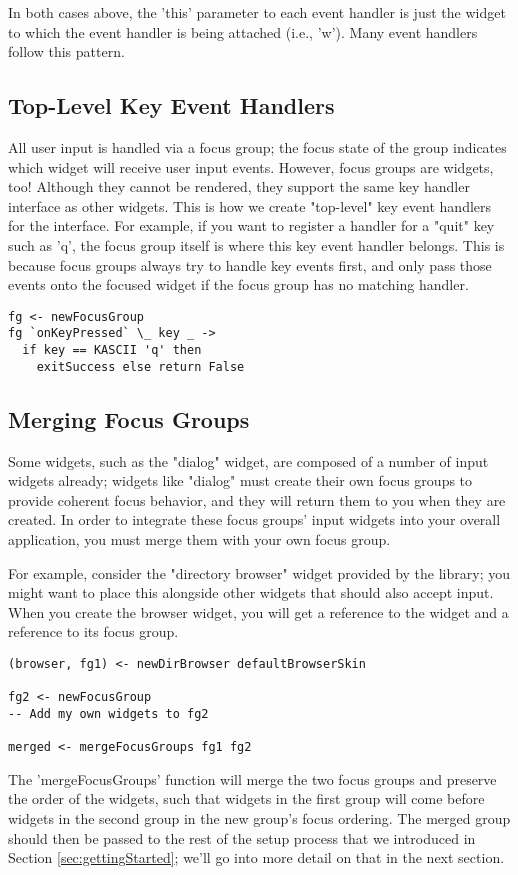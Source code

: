 In both cases above, the 'this' parameter to each event handler is just
the widget to which the event handler is being attached (i.e., 'w').
Many event handlers follow this pattern.

\subsection{Top-Level Key Event Handlers}

All user input is handled via a focus group; the focus state of the
group indicates which widget will receive user input events.  However,
focus groups are widgets, too!  Although they cannot be rendered, they
support the same key handler interface as other widgets.  This is how
we create "top-level" key event handlers for the interface.  For
example, if you want to register a handler for a "quit" key such as
'q', the focus group itself is where this key event handler belongs.
This is because focus groups always try to handle key events first,
and only pass those events onto the focused widget if the focus group
has no matching handler.

\begin{verbatim}
fg <- newFocusGroup
fg `onKeyPressed` \_ key _ ->
  if key == KASCII 'q' then
    exitSuccess else return False
\end{verbatim}

\subsection{Merging Focus Groups}

Some widgets, such as the "dialog" widget, are composed of a number of
input widgets already; widgets like "dialog" must create their own
focus groups to provide coherent focus behavior, and they will return
them to you when they are created.  In order to integrate these focus
groups' input widgets into your overall application, you must merge
them with your own focus group.

For example, consider the "directory browser" widget provided by the
library; you might want to place this alongside other widgets that
should also accept input.  When you create the browser widget, you will
get a reference to the widget and a reference to its focus group.

\begin{verbatim}
(browser, fg1) <- newDirBrowser defaultBrowserSkin

fg2 <- newFocusGroup
-- Add my own widgets to fg2

merged <- mergeFocusGroups fg1 fg2
\end{verbatim}

The 'mergeFocusGroups' function will merge the two focus groups and
preserve the order of the widgets, such that widgets in the first
group will come before widgets in the second group in the new group's
focus ordering.  The merged group should then be passed to the rest of
the setup process that we introduced in Section
\ref{sec:gettingStarted}; we'll go into more detail on that in the
next section.
